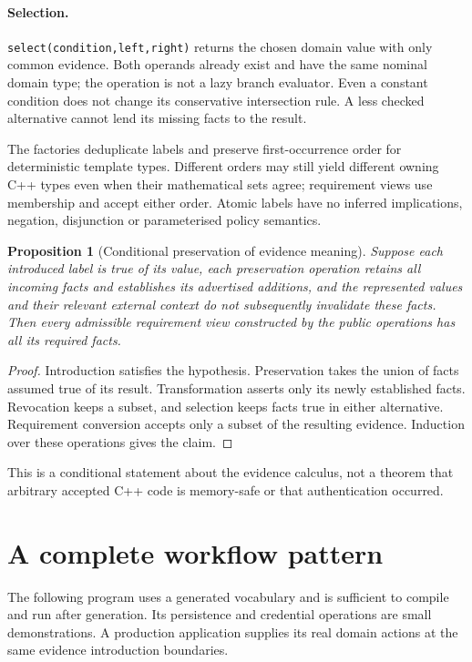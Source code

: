 \documentclass[11pt]{article}
\newtheorem{proposition}{Proposition}
\begin{document}
\paragraph{Selection.}
\texttt{select(condition,left,right)} returns the chosen domain value with
only common evidence. Both operands already exist and have the same nominal
domain type; the operation is not a lazy branch evaluator. Even a constant
condition does not change its conservative intersection rule. A less checked
alternative cannot lend its missing facts to the result.

The factories deduplicate labels and preserve first-occurrence order for
deterministic template types. Different orders may still yield different
owning C++ types even when their mathematical sets agree; requirement views
use membership and accept either order. Atomic labels have no inferred
implications, negation, disjunction or parameterised policy semantics.

\begin{proposition}[Conditional preservation of evidence meaning]
Suppose each introduced label is true of its value, each preservation operation
retains all incoming facts and establishes its advertised additions, and the
represented values and their relevant external context do not subsequently
invalidate these facts. Then every admissible requirement view constructed by
the public operations has all its required facts.
\end{proposition}
\begin{proof}
Introduction satisfies the hypothesis. Preservation takes the union of facts
assumed true of its result. Transformation asserts only its newly established
facts. Revocation keeps a subset, and selection keeps facts true in either
alternative. Requirement conversion accepts only a subset of the resulting
evidence. Induction over these operations gives the claim.
\end{proof}
This is a conditional statement about the evidence calculus, not a theorem
that arbitrary accepted C++ code is memory-safe or that authentication occurred.

\section{A complete workflow pattern}
The following program uses a generated vocabulary and is sufficient to compile
and run after generation. Its persistence and credential operations are small
demonstrations. A production application supplies its real domain actions at
the same evidence introduction boundaries.
\end{document}
